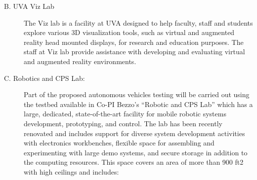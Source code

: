 \begin{description}
\item[B. UVA Viz Lab]
The Viz lab is a facility at UVA designed to help faculty, staff and students explore various 3D visualization tools, such as virtual and augmented reality head mounted displays, for research and education purposes. The staff at Viz lab provide assistance with developing and evaluating virtual and augmented reality environments. 

\item[C. Robotics and CPS Lab: ]
Part of the proposed autonomous vehicles testing will be carried out using the testbed available in Co-PI Bezzo’s “Robotic and CPS Lab” which has a large, dedicated, state-of-the-art facility for mobile robotic systems development, prototyping, and control. The lab has been recently renovated and includes support for diverse system development activities with electronics workbenches, ﬂexible space for assembling and experimenting with large demo systems, and secure storage in addition to the computing resources. This space covers an area of more than 900 ft2 with high ceilings and includes: 


\end{description}
